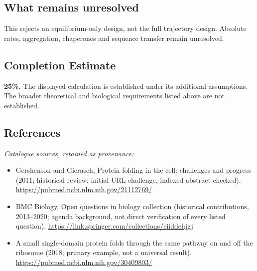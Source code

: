 \documentclass[11pt]{article}
\begin{document}
\subsection{What remains unresolved}
This rejects an equilibrium-only design, not the full trajectory design. Absolute rates, aggregation, chaperones and sequence transfer remain unresolved.
\subsection{Completion Estimate}
\textbf{25\%.} The displayed calculation is established under its additional assumptions. The broader theoretical and biological requirements listed above are not established.
\subsection{References}
\noindent\emph{Catalogue sources, retained as provenance:}
\begin{itemize}
\item Gershenson and Gierasch, Protein folding in the cell: challenges and progress (2011; historical review; initial URL challenge, indexed abstract checked). \url{https://pubmed.ncbi.nlm.nih.gov/21112769/}
\item BMC Biology, Open questions in biology collection (historical contributions, 2013--2020; agenda background, not direct verification of every listed question). \url{https://link.springer.com/collections/eiiddehjgj}
\item A small single-domain protein folds through the same pathway on and off the ribosome (2018; primary example, not a universal result). \url{https://pubmed.ncbi.nlm.nih.gov/30409803/}
\end{itemize}
\clearpage


\appendix
\end{document}
